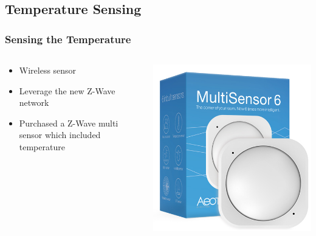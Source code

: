 \documentclass[aspectratio=169,11pt,hyperref={colorlinks=true}]{beamer}
\begin{document}
\subsection{Temperature Sensing}
\begin{frame}
    \frametitle{Sensing the Temperature}
    \begin{columns}
        \begin{column}{.48\textwidth}
            \begin{itemize}
                \item Wireless sensor
                \item Leverage the new Z-Wave network
                \item Purchased a Z-Wave multi sensor which included temperature
            \end{itemize}
        \end{column}
        \begin{column}{.48\textwidth}
            \includegraphics[width=\textwidth]{aeotec-multi.jpg}
        \end{column}
    \end{columns}
\end{frame}
\end{document}

